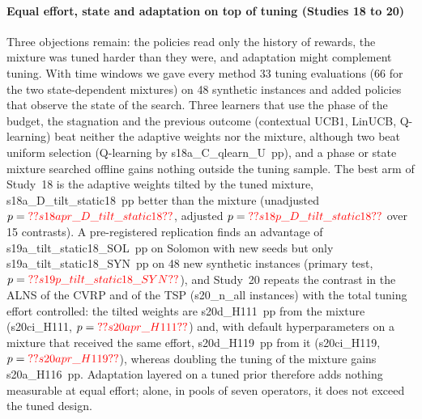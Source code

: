 \paragraph{Equal effort, state and adaptation on top of tuning (Studies 18 to 20)} Three objections remain: the policies read only the history of rewards, the mixture was tuned harder than they were, and adaptation might complement tuning. With time windows we gave every method 33 tuning evaluations (66 for the two state-dependent mixtures) on 48 synthetic instances and added policies that observe the state of the search. Three learners that use the phase of the budget, the stagnation and the previous outcome (contextual UCB1, LinUCB, Q-learning) beat neither the adaptive weights nor the mixture, although two beat uniform selection (Q-learning by \num{s18a_C_qlearn_U}~pp), and a phase or state mixture searched offline gains nothing outside the tuning sample. The best arm of Study~18 is the adaptive weights tilted by the tuned mixture, \num{s18a_D_tilt_static18}~pp better than the mixture (unadjusted $p=\num{s18apr_D_tilt_static18}$, adjusted $p=\num{s18p_D_tilt_static18}$ over 15 contrasts). A pre-registered replication finds an advantage of \num{s19a_tilt_static18_SOL}~pp on Solomon with new seeds but only \num{s19a_tilt_static18_SYN}~pp on 48 new synthetic instances (primary test, $p=\num{s19p_tilt_static18_SYN}$), and Study~20 repeats the contrast in the ALNS of the CVRP and of the TSP (\num{s20_n_all} instances) with the total tuning effort controlled: the tilted weights are \num{s20d_H111}~pp from the mixture (\num{s20ci_H111}, $p=\num{s20apr_H111}$) and, with default hyperparameters on a mixture that received the same effort, \num{s20d_H119}~pp from it (\num{s20ci_H119}, $p=\num{s20apr_H119}$), whereas doubling the tuning of the mixture gains \num{s20a_H116}~pp. Adaptation layered on a tuned prior therefore adds nothing measurable at equal effort; alone, in pools of seven operators, it does not exceed the tuned design.


